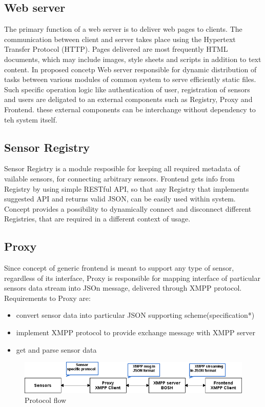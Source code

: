 	\subsection{Web server}
  The primary function of a web server is to deliver web pages to clients. The communication between client and server takes place using the Hypertext Transfer Protocol (HTTP). Pages delivered are most frequently HTML documents, which may include images, style sheets and scripts in addition to text content. 
  \newline In proposed concetp Web server responsible for dynamic distribution of tasks between various modules of common system to serve efficiently static files. Such specific operation logic like authentication of user, registration of sensors and users are deligated to an external components such as Registry, Proxy and Frontend. these external components can be interchange without dependency to teh system itself.

	\subsection{Sensor Registry}
  Sensor Registry is a module resposible for keeping all required metadata of vailable sensors, for connecting arbitrary sensors. Frontend gets info from Registry by using simple RESTful API, so that any Registry that implements suggested API and returns valid JSON, can be easily used within system. Concept provides a possibility to dynamically connect and disconnect different Registries, that are required in a different context of usage.

	\subsection{Proxy}
  Since concept of generic frontend is meant to support any type of sensor, regardless of its interface, Proxy is responsible for mapping interface of particular sensors data stream into JSOn message, delivered through XMPP protocol. Requirements to Proxy are:
  \begin{itemize}
  \item convert sensor data into particular JSON supporting scheme(specification*)
  \item implement XMPP protocol to provide exchange message with XMPP server
  \item get and parse sensor data
  \end{itemize}
    \begin{figure}[!ht]
    \centering
    \includegraphics[scale=0.6]{images/Protocol_flow.png}   
    \caption[Protocol flow]{Protocol flow}
    \label{img:protocol}                           
    \end{figure}

